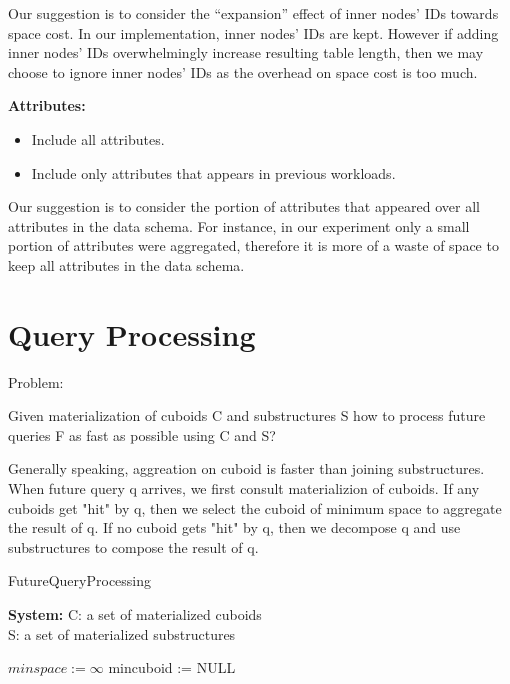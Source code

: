 Our suggestion is to consider the “expansion” effect of inner nodes' IDs towards space cost. In our implementation, inner nodes' IDs are kept. However if adding inner nodes' IDs overwhelmingly increase resulting table length, then we may choose to ignore inner nodes' IDs as the overhead on space cost is too much. 

\textbf{Attributes:}

\begin{itemize}
	\item Include all attributes.
	\item Include only attributes that appears in previous workloads.
	
\end{itemize}
 
Our suggestion is to consider the portion of attributes that appeared over all attributes in the data schema. For instance, in our experiment only a small portion of attributes were aggregated, therefore it is more of a waste of space to keep all attributes in the data schema.


\section{Query Processing}
Problem:

Given materialization of cuboids C and substructures S how to process future queries F as fast as possible using C and S? 

Generally speaking, aggreation on cuboid is faster than joining substructures. When future query q arrives, we first consult materializion of cuboids. If any cuboids get "hit" by q, then we select the cuboid of minimum space to aggregate the result of q. If no cuboid gets "hit" by q, then we decompose q and use substructures to compose the result of q. 

\begin{algorithm}[H]
	\caption{FutureQueryProcessing}
	\LinesNumbered
	\textbf{System:} C: a set of materialized cuboids\\ S: a set of materialized substructures\\ 
	
	$minspace:= \infty $\;
	mincuboid := NULL \;
\end{algorithm}
\clearpage

